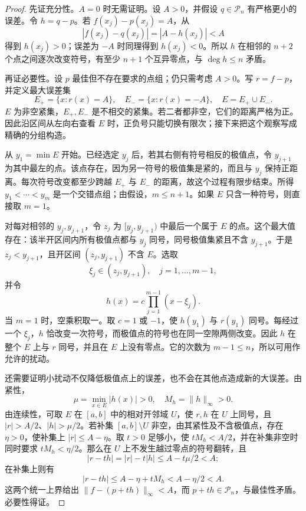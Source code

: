 \begin{proof}
先证充分性。\(A=0\) 时无需证明。设 \(A>0\)，并假设 \(q\in\mathcal P_n\) 有严格更小的误差。令 \(h=q-p\)。若 \(f(x_j)-p(x_j)=A\)，从
\[
 |f(x_j)-q(x_j)|=|A-h(x_j)|<A
\]
得到 \(h(x_j)>0\)；误差为 \(-A\) 时同理得到 \(h(x_j)<0\)。所以 \(h\) 在相邻的 \(n+2\) 个点之间逐次改变符号，有至少 \(n+1\) 个互异零点，与 \(\deg h\leq n\) 矛盾。

再证必要性。设 \(p\) 最佳但不存在要求的点组；仍只需考虑 \(A>0\)。写 \(r=f-p\)，并定义最大误差集
\[
 E_+=\{x:r(x)=A\},\quad E_-=\{x:r(x)=-A\},
 \quad E=E_+\cup E_-.
\]
\(E\) 为非空紧集，\(E_+,E_-\) 是不相交的紧集。若二者都非空，它们的距离严格为正。因此沿区间从左向右查看 \(E\) 时，正负号只能切换有限次；接下来把这个观察写成精确的分组构造。

从 \(y_1=\min E\) 开始。已经选定 \(y_j\) 后，若其右侧有符号相反的极值点，令 \(y_{j+1}\) 为其中最左的点。该点存在，因为另一符号的极值集是紧的，而且与 \(y_j\) 保持正距离。每次符号改变都至少跨越 \(E_+\) 与 \(E_-\) 的距离，故这个过程有限步结束。所得 \(y_1<\cdots<y_m\) 是一个交错点组；由假设，\(m\leq n+1\)。如果 \(E\) 只含一种符号，则直接取 \(m=1\)。

对每对相邻的 \(y_j,y_{j+1}\)，令 \(z_j\) 为 \([y_j,y_{j+1})\) 中最后一个属于 \(E\) 的点。这个最大值存在：该半开区间内所有极值点都与 \(y_j\) 同号，同号极值集紧且不含 \(y_{j+1}\)。于是 \(z_j<y_{j+1}\)，且开区间 \((z_j,y_{j+1})\) 不含 \(E\)。选取
\[
 \xi_j\in(z_j,y_{j+1}),\quad j=1,\ldots,m-1,
\]
并令
\[
 h(x)=c\prod_{j=1}^{m-1}(x-\xi_j).
\]
当 \(m=1\) 时，空乘积取一。取 \(c=1\) 或 \(-1\)，使 \(h(y_1)\) 与 \(r(y_1)\) 同号。每经过一个 \(\xi_j\)，\(h\) 恰改变一次符号，而极值点的符号也在同一空隙两侧改变。因此 \(h\) 在整个 \(E\) 上与 \(r\) 同号，并且在 \(E\) 上没有零点。它的次数为 \(m-1\leq n\)，所以可用作允许的扰动。

还需要证明小扰动不仅降低极值点上的误差，也不会在其他点造成新的大误差。由紧性，
\[
 \mu=\min_{x\in E}|h(x)|>0,\quad
 M_h=\lVert h\rVert_\infty>0.
\]
由连续性，可取 \(E\) 在 \([a,b]\) 中的相对开邻域 \(U\)，使 \(r,h\) 在 \(U\) 上同号，且 \(|r|>A/2\)、\(|h|>\mu/2\)。若补集 \([a,b]\setminus U\) 非空，由其紧性及不含极值点，存在 \(\eta>0\)，使补集上 \(|r|\leq A-\eta\)。取 \(t>0\) 足够小，使 \(tM_h<A/2\)，并在补集非空时同时要求 \(tM_h<\eta/2\)。那么在 \(U\) 上不发生越过零点的符号翻转，且
\[
 |r-th|=|r|-t|h|\leq A-t\mu/2<A;
\]
在补集上则有
\[
 |r-th|\leq A-\eta+tM_h<A-\eta/2<A.
\]
这两个统一上界给出 \(\lVert f-(p+th)\rVert_\infty<A\)，而 \(p+th\in\mathcal P_n\)，与最佳性矛盾。必要性得证。
\end{proof}

